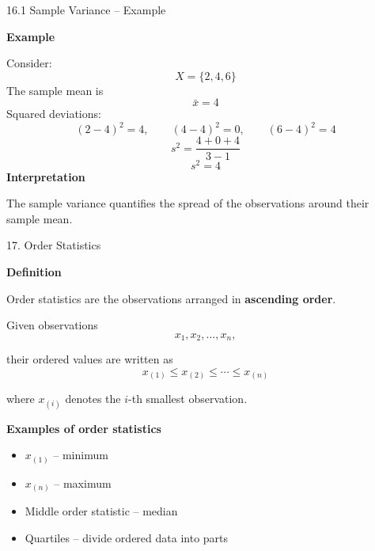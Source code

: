 
\begin{frame}{16.1 Sample Variance -- Example}

\textbf{Example}

Consider:
\[
X=\{2,4,6\}
\]
The sample mean is
\[
\bar{x}=4
\]
Squared deviations:
\[
(2-4)^2=4,\qquad
(4-4)^2=0,\qquad
(6-4)^2=4
\]
\[
s^2
=
\frac{4+0+4}{3-1}
\]
\[
\boxed{s^2=4}
\]
\textbf{Interpretation}

The sample variance quantifies the spread of the observations
around their sample mean.

\end{frame}



\begin{frame}{17. Order Statistics}

\textbf{Definition}

Order statistics are the observations arranged in
\textbf{ascending order}.

\vspace{0.1cm}

Given observations
\[
x_1,x_2,\ldots,x_n,
\]

their ordered values are written as
\[
\boxed{
x_{(1)}\leq x_{(2)}\leq\cdots\leq x_{(n)}
}
\]

where $x_{(i)}$ denotes the $i$-th smallest observation.

\vspace{0.1cm}

\textbf{Examples of order statistics}

\begin{itemize}
    \item $x_{(1)}$ -- minimum
    \item $x_{(n)}$ -- maximum
    \item Middle order statistic -- median
    \item Quartiles -- divide ordered data into parts
\end{itemize}

\end{frame}



